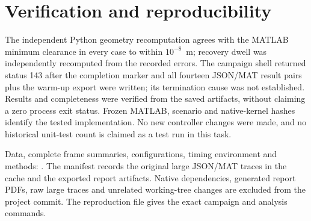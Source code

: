 \documentclass[11pt]{article}
\begin{document}
\section{Verification and reproducibility}
The independent Python geometry recomputation agrees with the MATLAB minimum
clearance in every case to within $10^{-8}$~m; recovery dwell was independently
recomputed from the recorded errors. The campaign shell returned status 143 after the completion marker and all
fourteen JSON/MAT result pairs plus the warm-up export were written; its
termination cause was not established. Results and completeness were verified
from the saved artifacts, without claiming a zero process exit status.
Frozen MATLAB, scenario and native-kernel
hashes identify the tested implementation. No new controller changes were
made, and no historical unit-test count is claimed as a test run in this task.

Data, complete frame summaries, configurations, timing environment and methods:
.
The manifest records the original large JSON/MAT traces in the cache and the
exported report artifacts. Native dependencies, generated report PDFs, raw
large traces and unrelated working-tree changes are excluded from the project
commit. The reproduction file gives the exact campaign and analysis commands.
\end{document}
